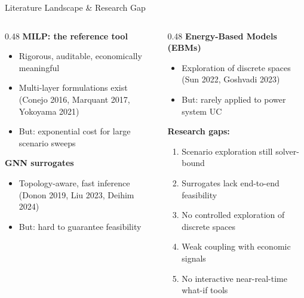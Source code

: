 \documentclass[aspectratio=169, 10pt]{beamer}
\begin{document}
\begin{frame}{Literature Landscape \& Research Gap}
\begin{columns}[T]
\begin{column}{0.48\textwidth}
\textbf{MILP: the reference tool}
\begin{itemize}
  \item Rigorous, auditable, economically meaningful
  \item Multi-layer formulations exist\\{\scriptsize (Conejo 2016, Marquant 2017, Yokoyama 2021)}
  \item \alert{But:} exponential cost for large scenario sweeps
\end{itemize}
\vspace{0.4em}
\textbf{GNN surrogates}
\begin{itemize}
  \item Topology-aware, fast inference\\{\scriptsize (Donon 2019, Liu 2023, Deihim 2024)}
  \item \alert{But:} hard to guarantee feasibility
\end{itemize}
\end{column}
\begin{column}{0.48\textwidth}
\textbf{Energy-Based Models (EBMs)}
\begin{itemize}
  \item Exploration of discrete spaces\\{\scriptsize (Sun 2022, Goshvadi 2023)}
  \item \alert{But:} rarely applied to power system UC
\end{itemize}
\vspace{0.4em}
\textbf{\textcolor{powOrange}{Research gaps:}}
\begin{enumerate}
  \item Scenario exploration still solver-bound
  \item Surrogates lack end-to-end feasibility
  \item No controlled exploration of discrete spaces
  \item Weak coupling with economic signals
  \item No interactive near-real-time what-if tools
\end{enumerate}
\end{column}
\end{columns}
\end{frame}

\end{document}
